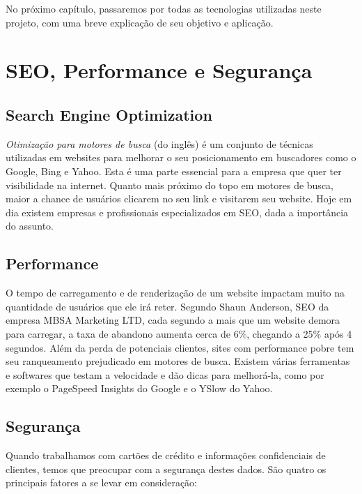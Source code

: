 No próximo capítulo, passaremos por todas as tecnologias utilizadas neste projeto, com uma breve explicação de seu objetivo e aplicação.

\section{SEO, Performance e Segurança}

\subsection{Search Engine Optimization}

\textit{Otimização para motores de busca} (do inglês) é um conjunto de técnicas utilizadas em websites para melhorar o seu posicionamento em buscadores como o Google, Bing e Yahoo. Esta é uma parte essencial para a empresa que quer ter visibilidade na internet. Quanto mais próximo do topo em motores de busca, maior a chance de usuários clicarem no seu link e visitarem seu website. Hoje em dia existem empresas e profissionais especializados em SEO, dada a importância do assunto.

\subsection{Performance}

O tempo de carregamento e de renderização de um website impactam muito na quantidade de usuários que ele irá reter. Segundo Shaun Anderson\cite{LoadTime}, SEO da empresa MBSA Marketing LTD, cada segundo a mais que um website demora para carregar, a taxa de abandono aumenta cerca de 6\%, chegando a 25\% após 4 segundos. Além da perda de potenciais clientes, sites com performance pobre tem seu ranqueamento prejudicado em motores de busca. Existem várias ferramentas e softwares que testam a velocidade e dão dicas para melhorá-la, como por exemplo o PageSpeed Insights do Google e o YSlow do Yahoo.

\subsection{Segurança}

Quando trabalhamos com cartões de crédito e informações confidenciais de clientes, temos que preocupar com a segurança destes dados. São quatro os principais fatores a se levar em consideração\cite{SecurityEcommerce}:

